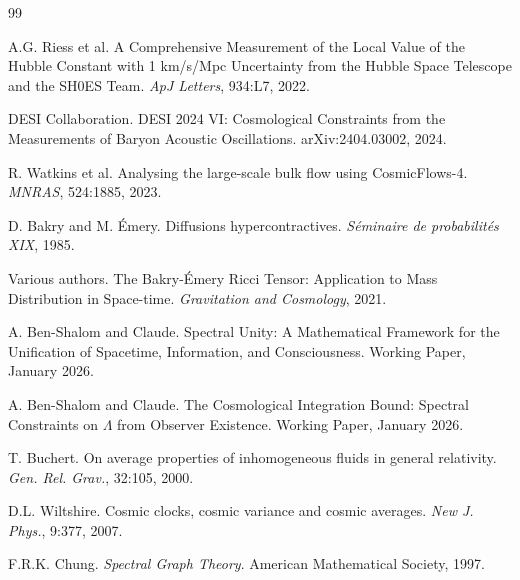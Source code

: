 \documentclass[11pt,a4paper]{article}
\theoremstyle{plain}
\theoremstyle{definition}
\theoremstyle{remark}
\begin{document}
\begin{thebibliography}{99}

A.G. Riess et al.
\newblock A Comprehensive Measurement of the Local Value of the Hubble Constant with 1 km/s/Mpc Uncertainty from the Hubble Space Telescope and the SH0ES Team.
\newblock \emph{ApJ Letters}, 934:L7, 2022.

DESI Collaboration.
\newblock DESI 2024 VI: Cosmological Constraints from the Measurements of Baryon Acoustic Oscillations.
\newblock arXiv:2404.03002, 2024.

R. Watkins et al.
\newblock Analysing the large-scale bulk flow using CosmicFlows-4.
\newblock \emph{MNRAS}, 524:1885, 2023.

D. Bakry and M. \'{E}mery.
\newblock Diffusions hypercontractives.
\newblock \emph{S\'{e}minaire de probabilit\'{e}s XIX}, 1985.

Various authors.
\newblock The Bakry-\'{E}mery Ricci Tensor: Application to Mass Distribution in Space-time.
\newblock \emph{Gravitation and Cosmology}, 2021.

A. Ben-Shalom and Claude.
\newblock Spectral Unity: A Mathematical Framework for the Unification of Spacetime, Information, and Consciousness.
\newblock Working Paper, January 2026.

A. Ben-Shalom and Claude.
\newblock The Cosmological Integration Bound: Spectral Constraints on $\Lambda$ from Observer Existence.
\newblock Working Paper, January 2026.

T. Buchert.
\newblock On average properties of inhomogeneous fluids in general relativity.
\newblock \emph{Gen. Rel. Grav.}, 32:105, 2000.

D.L. Wiltshire.
\newblock Cosmic clocks, cosmic variance and cosmic averages.
\newblock \emph{New J. Phys.}, 9:377, 2007.

F.R.K. Chung.
\newblock \emph{Spectral Graph Theory}.
\newblock American Mathematical Society, 1997.

\end{thebibliography}
\end{document}
